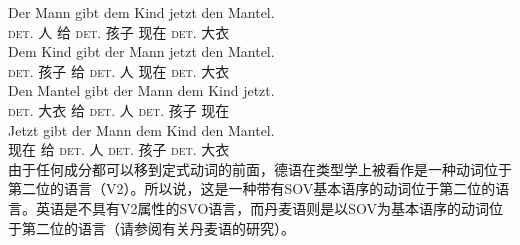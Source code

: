 \eal
\ex 
\gll Der Mann gibt dem Kind jetzt den Mantel.\\
      \textsc{det}.\nom{} 人 给 \textsc{det}.\dat{} 孩子 现在 \textsc{det}.\acc{} 大衣\\
\ex 
\gll Dem Kind gibt der Mann jetzt den Mantel.\\
     \textsc{det}.\dat{} 孩子 给 \textsc{det}.\nom{} 人 现在 \textsc{det}.\acc{} 大衣\\
\ex 
\gll Den Mantel gibt der Mann dem Kind jetzt.\\
	 \textsc{det}.\acc{} 大衣 给 \textsc{det}.\nom{} 人 \textsc{det}.\dat{} 孩子 现在\\
\ex 
\gll Jetzt gibt der Mann dem Kind den Mantel.\\
	 现在 给 \textsc{det}.\nom{} 人 \textsc{det}.\dat{} 孩子 \textsc{det}.\acc{} 大衣\\
\zl
由于任何成分都可以移到定式动词的前面，德语在类型学上被看作是一种动词位于第二位的语言（V2）。所以说，这是一种带有SOV基本语序的动词位于第二位的语言。英语是不具有V2属性的SVO语言，而丹麦语则是以SOV为基本语序的动词位于第二位的语言（请参阅\citealp{Oersnes2009b}有关丹麦语的研究）。

